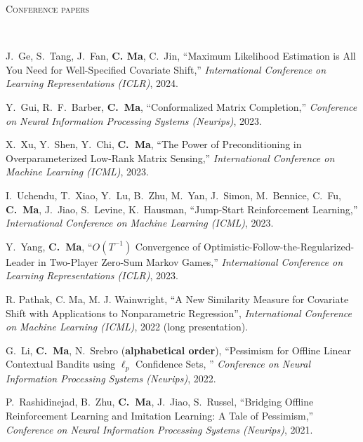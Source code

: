 \documentclass[a4paper, 10pt]{article}
\newenvironment{changemargin}[2]{%
  \begin{list}{}{%
    \setlength{\topsep}{0pt}%
    \setlength{\leftmargin}{#1}%
    \setlength{\rightmargin}{#2}%
    \setlength{\listparindent}{\parindent}%
    \setlength{\itemindent}{\parindent}%
    \setlength{\parsep}{\parskip}%
  }%
  \item[]}{\end{list}
}
\newcommand{\lineover}{
	\begin{changemargin}{-0.05in}{-0.05in}
		\vspace*{-8pt}
		\hrulefill \\
		\vspace*{-2pt}
	\end{changemargin}
}
\newcommand{\header}[1]{
	\begin{changemargin}{-0.5in}{-0.5in}
		\scshape{#1}\\
  	\lineover
	\end{changemargin}
}
\newenvironment{body} {
	\vspace*{-16pt}
	\begin{changemargin}{-0.3in}{-0.5in}
  }	
	{\end{changemargin}
}
\begin{document}
\bigskip
\header{\LARGE{Conference papers}}
\begin{body}
	\vspace{18pt}
	\begin{enumerate}[label={[{C}{{\arabic*}}]}]
	
	\item J.~Ge, S.~Tang, J.~Fan, \textbf{C. Ma}, C.~Jin, ``Maximum Likelihood Estimation is All You Need for Well-Specified Covariate Shift,'' \emph{International Conference on Learning Representations (ICLR)}, 2024.
	\item Y.~Gui, R.~F.~Barber, \textbf{C.~Ma}, ``Conformalized Matrix Completion,'' \emph{Conference on Neural Information Processing Systems (Neurips)}, 2023.
	
	\item X.~Xu, Y.~Shen, Y.~Chi, \textbf{C.~Ma}, ``The Power of Preconditioning in Overparameterized Low-Rank Matrix Sensing,'' \emph{International Conference on Machine Learning (ICML)}, 2023.
	

	
	\item I.~Uchendu, T.~Xiao, Y.~Lu, B.~Zhu, M.~Yan, J.~Simon, M.~Bennice, C.~Fu, \textbf{C.~Ma}, J.~Jiao, S.~Levine, K.~Hausman, ``Jump-Start Reinforcement Learning,'' \emph{International Conference on Machine Learning (ICML)}, 2023.
	
		\item Y.~Yang, \textbf{C.~Ma}, {``$O(T^{-1})$ Convergence of Optimistic-Follow-the-Regularized-Leader in Two-Player Zero-Sum Markov Games,''} \emph{International Conference on Learning Representations (ICLR)}, 2023. \\
	
	\item R. Pathak, C. Ma, M. J. Wainwright, {``A New Similarity Measure for Covariate Shift with Applications to Nonparametric Regression''}, \emph{International Conference on Machine Learning (ICML)}, 2022 (long presentation).
	
	\item G.~Li, \textbf{C.~Ma}, N.~Srebro (\textbf{alphabetical order}), {``Pessimism for Offline Linear Contextual Bandits using $\ell_p$ Confidence Sets, ''} \emph{Conference on Neural Information Processing Systems (Neurips)}, 2022.
	\item P.~Rashidinejad, B.~Zhu, \textbf{C.~Ma}, J.~Jiao, S.~Russel, {``Bridging Offline Reinforcement Learning and Imitation Learning: A Tale of Pessimism,''} \emph{Conference on Neural Information Processing Systems (Neurips)}, 2021. \\
	

\end{enumerate}
\end{body}
\end{document}
